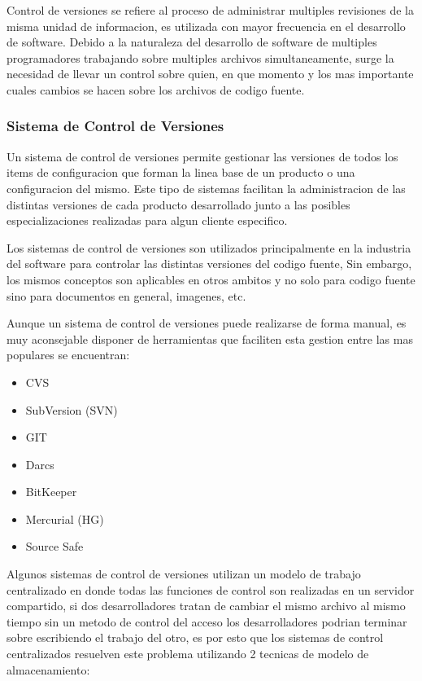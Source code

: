Control de versiones se refiere al proceso de administrar multiples revisiones de la misma unidad de informacion, es utilizada con mayor frecuencia en el desarrollo de software.
Debido a la naturaleza del desarrollo de software de multiples programadores trabajando sobre multiples archivos simultaneamente, surge la necesidad de llevar un control sobre quien, en que momento y los mas importante cuales cambios se hacen sobre los archivos de codigo fuente.


\subsubsection*{Sistema de Control de Versiones}

Un sistema de control de versiones permite gestionar las versiones de todos los items de configuracion que forman la linea base de un producto o una configuracion del mismo. Este tipo de sistemas facilitan la administracion de las distintas versiones de cada producto desarrollado junto a las posibles especializaciones realizadas para algun cliente especifico.

Los sistemas de control de versiones son utilizados principalmente en la industria del software para controlar las distintas versiones del codigo fuente, Sin embargo, los mismos conceptos son aplicables en otros ambitos y no solo para codigo fuente sino para documentos en general, imagenes, etc.

Aunque un sistema de control de versiones puede realizarse de forma manual, es muy aconsejable disponer de herramientas que faciliten esta gestion entre las mas populares se encuentran:

\begin{itemize}

	\item CVS \cite{cvs}
	\item SubVersion (SVN) \cite{svn}
	\item GIT \cite{git}
	\item Darcs \cite{darcs}
	\item BitKeeper \cite{bitkeeper}
	\item Mercurial (HG) \cite{mercurial}
	\item Source Safe \cite{ssafe}

\end{itemize}


Algunos sistemas de control de versiones utilizan un modelo de trabajo centralizado en donde todas las funciones de control son realizadas en un servidor compartido, si dos desarrolladores tratan de cambiar el mismo archivo al mismo tiempo sin un metodo de control del acceso los desarrolladores podrian terminar sobre escribiendo el trabajo del otro, es por esto que los sistemas de control centralizados resuelven este problema utilizando 2 tecnicas de modelo de almacenamiento:


